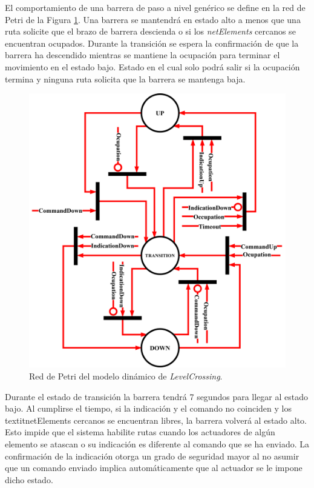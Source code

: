 El comportamiento de una barrera de paso a nivel genérico se define en la red de Petri de la Figura \ref{fig:LCB_Petri}. Una barrera se mantendrá en estado alto a menos que una ruta solicite que el brazo de barrera descienda o si los \textit{netElements} cercanos se encuentran ocupados. Durante la transición se espera la confirmación de que la barrera ha descendido mientras se mantiene la ocupación para terminar el movimiento en el estado bajo. Estado en el cual solo podrá salir si la ocupación termina y ninguna ruta solicita que la barrera se mantenga baja.

\begin{figure}[H]
	\centering
	\includegraphics[width=1\textwidth]{Figuras/LCB_petri}
	\centering\caption{Red de Petri del modelo dinámico de \textit{LevelCrossing}.}
	\label{fig:LCB_Petri}
\end{figure}

Durante el estado de transición la barrera tendrá 7 segundos para llegar al estado bajo. Al cumplirse el tiempo, si la indicación y el comando no coinciden y los textit{netElements} cercanos se encuentran libres, la barrera volverá al estado alto. Esto impide que el sistema habilite rutas cuando los actuadores de algún elemento se atascan o su indicación es diferente al comando que se ha enviado. La confirmación de la indicación otorga un grado de seguridad mayor al no asumir que un comando enviado implica automáticamente que al actuador se le impone dicho estado.